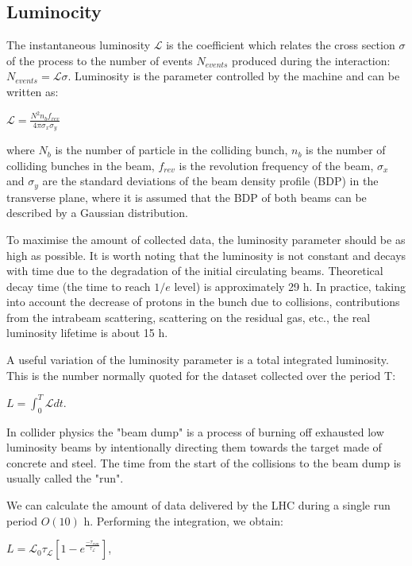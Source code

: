 \begin{normalsize}
\subsection{Luminocity}


The instantaneous luminosity $ \mathcal{L} $ is the coefficient which relates the cross section $\sigma$ of the process to the number of events $N_{events}$ produced during the interaction: $N_{events} = \mathcal{L}  \sigma$. Luminosity is the parameter controlled by the machine and can be written as:

$ \mathcal{L} =\frac{N^2 n_b f_{rev}}{4\pi \sigma_x \sigma_y}$

\noindent where $N_b$ is the number of particle in the colliding bunch, $n_b$ is the number of colliding bunches in the beam, $f_{rev}$ is the revolution frequency of the beam, $\sigma_x$ and $\sigma_y$ are the standard deviations of the beam density profile (BDP) in the transverse plane, where it is assumed that the BDP of both beams can be described by a Gaussian distribution.


To maximise the amount of collected data, the luminosity parameter should be as high as possible. It is worth noting that the luminosity is not constant and decays with time due to the degradation of the initial circulating beams. Theoretical decay time (the time to reach $1/e$ level) is approximately 29 h. In practice, taking into account the decrease of protons in the bunch due to collisions, contributions from the intrabeam scattering, scattering on the residual gas, etc., the real luminosity lifetime is about 15 h. 

A useful variation of the luminosity parameter is a total integrated luminosity. This is the number normally quoted for the dataset collected over the period T:

$L = \int_{0}^{T} \mathcal{L}  dt$.

In collider physics the "beam dump" is a process of burning off exhausted low luminosity beams by intentionally directing them towards the target made of concrete and steel. The time from the start of the collisions to the beam dump is usually called the "run".

We can calculate the amount of data delivered by the LHC during a single run period $O(10)$ h. Performing the integration, we obtain: 

 $L = \mathcal{L}_0 \tau_\mathcal{L}  \left[  1- e^{\frac{-\tau_{run}}{\tau_\mathcal{L} }}  \right]$, 


\end{normalsize}
